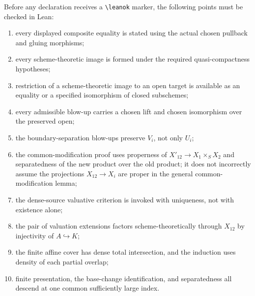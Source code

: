 Before any declaration receives a \verb|\leanok| marker, the following points
must be checked in Lean:
\begin{enumerate}
  \item every displayed composite equality is stated using the actual chosen
    pullback and gluing morphisms;
  \item every scheme-theoretic image is formed under the required
    quasi-compactness hypotheses;
  \item restriction of a scheme-theoretic image to an open target is available
    as an equality or a specified isomorphism of closed subschemes;
  \item every admissible blow-up carries a chosen lift and chosen isomorphism
    over the preserved open;
  \item the boundary-separation blow-ups preserve $V_i$, not only $U_i$;
  \item the common-modification proof uses properness of
    $X'_{12}\to X_1\times_SX_2$ and separatedness of the new product over the
    old product; it does not incorrectly assume the projections
    $X_{12}\to X_i$ are proper in the general common-modification lemma;
  \item the dense-source valuative criterion is invoked with uniqueness, not
    with existence alone;
  \item the pair of valuation extensions factors scheme-theoretically through
    $X_{12}$ by injectivity of $A\hookrightarrow K$;
  \item the finite affine cover has dense total intersection, and the induction
    uses density of each partial overlap;
  \item finite presentation, the base-change identification, and separatedness
    all descend at one common sufficiently large index.
\end{enumerate}

